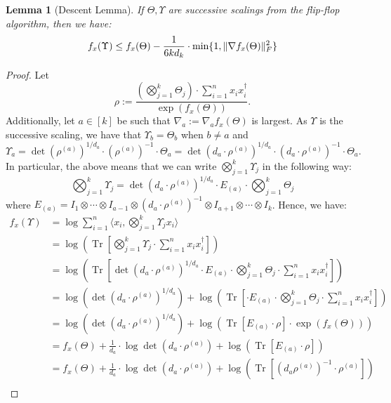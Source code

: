 \documentclass{article}
\newtheorem{lemma}[theorem]{Lemma}
\DeclarePairedDelimiter{\norm}{\lVert}{\rVert}
\newcommand\tr{\operatorname{Tr}}
\begin{document}
\begin{lemma}[Descent Lemma]\label{lem:tensor-descent-lemma}
	If $\Theta, \Upsilon$ are successive scalings from the flip-flop algorithm, then we have:
	$$ f_x(\Upsilon) \leq f_x(\Theta) - \dfrac{1}{6k d_k} \cdot \min\{1, \norm{\nabla f_x(\Theta)}_F^2\} $$
\end{lemma}

\begin{proof}
	Let 
	$$\rho := \dfrac{\left( \bigotimes_{j=1}^k \Theta_j \right) \cdot \sum_{i=1}^n x_i x_i^\dagger}{\exp(f_x(\Theta))}.$$
	Additionally, let $a \in [k]$ be such that $\nabla_a := \nabla_a f_x(\Theta)$ is largest. As $\Upsilon$ is the successive scaling, we have that $\Upsilon_b = \Theta_b$ when $b \neq a$ and 
	$$ \Upsilon_a = \det(\rho^{(a)})^{1/d_a} \cdot (\rho^{(a)})^{-1} \cdot \Theta_a = \det(d_a \cdot \rho^{(a)})^{1/d_a} \cdot (d_a \cdot \rho^{(a)})^{-1} \cdot \Theta_a. $$
	In particular, the above means that we can write $\bigotimes_{j=1}^k \Upsilon_j$ in the following way:
	$$ \bigotimes_{j=1}^k \Upsilon_j = \det(d_a \cdot \rho^{(a)})^{1/d_a} \cdot E_{(a)} \cdot \bigotimes_{j=1}^k \Theta_j $$
	where $E_{(a)} = I_1 \otimes \cdots \otimes I_{a-1} \otimes (d_a \cdot \rho^{(a)})^{-1} \otimes I_{a+1} \otimes \cdots \otimes I_k$.
	Hence, we have:
	\begin{align*}
		f_x(\Upsilon) &= \log \sum_{i=1}^n \langle x_i , \bigotimes_{j=1}^k \Upsilon_j x_i \rangle \\
		&= \log\left(\tr\left[ \bigotimes_{j=1}^k \Upsilon_j \cdot  \sum_{i=1}^n x_i x_i^\dagger  \right]\right) \\ 
		&= \log\left(\tr\left[ \det(d_a \cdot \rho^{(a)})^{1/d_a} \cdot E_{(a)} \cdot \bigotimes_{j=1}^k \Theta_j \cdot  \sum_{i=1}^n x_i x_i^\dagger  \right]\right) \\
		&= \log\left(\det(d_a \cdot \rho^{(a)})^{1/d_a} \right) +  \log\left(\tr\left[ \cdot E_{(a)} \cdot \bigotimes_{j=1}^k \Theta_j \cdot  \sum_{i=1}^n x_i x_i^\dagger  \right]\right) \\
		&= \log\left(\det(d_a \cdot \rho^{(a)})^{1/d_a} \right) +  \log\left(\tr\left[ E_{(a)} \cdot \rho \right] \cdot \exp(f_x(\Theta)) \right) \\
		&= f_x(\Theta) + \frac{1}{d_a} \cdot  \log\det(d_a \cdot \rho^{(a)})  +  \log\left(\tr\left[ E_{(a)} \cdot \rho \right] \right) \\
		&= f_x(\Theta) + \frac{1}{d_a} \cdot  \log\det(d_a \cdot \rho^{(a)})  +  \log\left(\tr\left[ (d_a \rho^{(a)})^{-1} \cdot \rho^{(a)} \right] \right) \\

\end{align*}
\end{proof}
\end{document}

